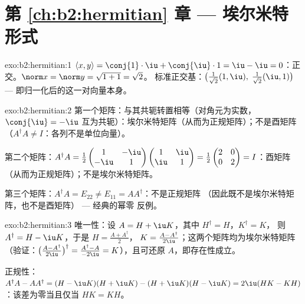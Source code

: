\section*{第 \ref{ch:b2:hermitian} 章 --- 埃尔米特形式}

\begin{solution}{exo:b2:hermitian:1}
$\langle x, y\rangle = \conj{1}\cdot\iu + \conj{\iu}\cdot 1 = \iu -
\iu = 0$：正交。$\norm x = \norm y = \sqrt{1 + 1} = \sqrt2$。
标准正交基：$\bigl(\frac{1}{\sqrt2}(1, \iu),\;
\frac{1}{\sqrt2}(\iu, 1)\bigr)$ --- 即归一化后的这一对向量本身。
\end{solution}

\begin{solution}{exo:b2:hermitian:2}
第一个矩阵：与其共轭转置相等（对角元为实数，$\conj{\iu} =
-\iu$ 互为共轭）：埃尔米特矩阵（从而为正规矩阵）；不是酉矩阵（$A^\dagger A
\neq I$：各列不是单位向量）。

第二个矩阵：$A^\dagger A = \frac12\begin{pmatrix} 1 & -\iu\\ -\iu &
1\end{pmatrix}\begin{pmatrix} 1 & \iu\\ \iu & 1\end{pmatrix} =
\frac12\begin{pmatrix} 2 & 0\\ 0 & 2\end{pmatrix} = I$：酉矩阵
（从而为正规矩阵）；不是埃尔米特矩阵。

第三个矩阵：$A^\dagger A = E_{22} \neq E_{11} = AA^\dagger$：不是正规矩阵
（因此既不是埃尔米特矩阵，也不是酉矩阵） --- 经典的幂零
反例。
\end{solution}

\begin{solution}{exo:b2:hermitian:3}
唯一性：设 $A = H + \iu K$，其中 $H^\dagger = H$，$K^\dagger = K$，
则 $A^\dagger = H - \iu K$，于是 $H = \frac{A + A^\dagger}{2}$，
$K = \frac{A - A^\dagger}{2\iu}$；这两个矩阵均为埃尔米特矩阵
（验证：$\bigl(\frac{A - A^\dagger}{2\iu}\bigr)^\dagger = \frac{
A^\dagger - A}{-2\iu} = K$），且可还原 $A$，即存在性成立。

正规性：$A^\dagger A - AA^\dagger = (H - \iu K)(H + \iu K) - (H
+ \iu K)(H - \iu K) = 2\iu(HK - KH)$：该差为零当且仅当 $HK = KH$。
\end{solution}

